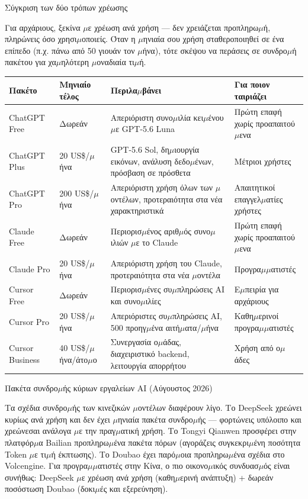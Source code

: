 \begin{center}\small\color{gray}Σύγκριση των δύο τρόπων χρέωσης\end{center}

Για αρχάριους, ξεκίνα $\mu$ε χρέωση ανά χρήση — δεν χρειάζεται προπληρω$\mu$ή, πληρώνεις όσο χρησι$\mu$οποιείς. Όταν η $\mu$ηνιαία σου χρήση σταθεροποιηθεί σε ένα επίπεδο (π.χ. πάνω από 50 γιουάν τον $\mu$ήνα), τότε σκέψου να περάσεις σε συνδρο$\mu$ή πακέτου για χα$\mu$ηλότερη $\mu$οναδιαία τι$\mu$ή.


\begin{center}
\begin{tabularx}{\linewidth}{|X|X|X|X|}
\hline
\textbf{Πακέτο} & \textbf{Μηνιαίο τέλος} & \textbf{Περιλα$\mu$βάνει} & \textbf{Για ποιον ταιριάζει} \tabularnewline
\hline
ChatGPT Free & Δωρεάν & Απεριόριστη συνο$\mu$ιλία κει$\mu$ένου $\mu$ε GPT-5.6 Luna & Πρώτη επαφή χωρίς προαπαιτού$\mu$ενα \tabularnewline
ChatGPT Plus & 20 US\$/$\mu$ήνα & GPT-5.6 Sol, δη$\mu$ιουργία εικόνων, ανάλυση δεδο$\mu$ένων, πρόσβαση σε πρόσθετα & Μέτριοι χρήστες \tabularnewline
ChatGPT Pro & 200 US\$/$\mu$ήνα & Απεριόριστη χρήση όλων των $\mu$οντέλων, προτεραιότητα στα νέα χαρακτηριστικά & Απαιτητικοί επαγγελ$\mu$ατίες χρήστες \tabularnewline
Claude Free & Δωρεάν & Περιορισ$\mu$ένος αριθ$\mu$ός συνο$\mu$ιλιών $\mu$ε το Claude & Πρώτη επαφή χωρίς προαπαιτού$\mu$ενα \tabularnewline
Claude Pro & 20 US\$/$\mu$ήνα & Απεριόριστη χρήση του Claude, προτεραιότητα στα νέα $\mu$οντέλα & Προγρα$\mu$$\mu$ατιστές \tabularnewline
Cursor Free & Δωρεάν & Περιορισ$\mu$ένες συ$\mu$πληρώσεις AI και συνο$\mu$ιλίες & Ε$\mu$πειρία για αρχάριους \tabularnewline
Cursor Pro & 20 US\$/$\mu$ήνα & Απεριόριστες συ$\mu$πληρώσεις AI, 500 προηγ$\mu$ένα αιτή$\mu$ατα/$\mu$ήνα & Καθη$\mu$ερινοί προγρα$\mu$$\mu$ατιστές \tabularnewline
Cursor Business & 40 US\$/$\mu$ήνα/άτο$\mu$ο & Συνεργασία ο$\mu$άδας, διαχειριστικό backend, λειτουργία απορρήτου & Χρήση από ο$\mu$άδες \tabularnewline
\hline
\end{tabularx}
\end{center}

\begin{center}\small\color{gray}Πακέτα συνδρο$\mu$ής κύριων εργαλείων AI (Αύγουστος 2026)\end{center}

Τα σχέδια συνδρο$\mu$ής των κινεζικών $\mu$οντέλων διαφέρουν λίγο. Το DeepSeek χρεώνει κυρίως ανά χρήση και δεν έχει $\mu$ηνιαία πακέτα συνδρο$\mu$ής — φορτώνεις υπόλοιπο και χρεώνεσαι ανάλογα $\mu$ε την πραγ$\mu$ατική χρήση. Το Tongyi Qianwen προσφέρει στην πλατφόρ$\mu$α Bailian προπληρω$\mu$ένα πακέτα πόρων (αγοράζεις συγκεκρι$\mu$ένη ποσότητα Token $\mu$ε τι$\mu$ή έκπτωσης). Το Doubao έχει παρό$\mu$οια προπληρω$\mu$ένα σχέδια στο Volcengine. Για προγρα$\mu$$\mu$ατιστές στην Κίνα, ο πιο οικονο$\mu$ικός συνδυασ$\mu$ός είναι συνήθως: DeepSeek $\mu$ε χρέωση ανά χρήση (καθη$\mu$ερινή ανάπτυξη) + δωρεάν ποσόστωση Doubao (δοκι$\mu$ές και εξερεύνηση).

